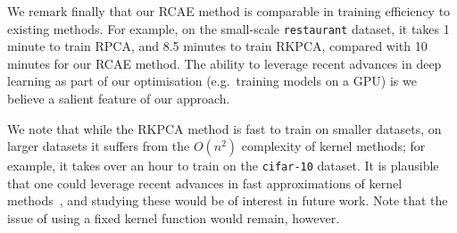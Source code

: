 We remark finally that our RCAE method is comparable in training efficiency to existing methods.
For example, on the small-scale {\tt restaurant} dataset, it takes 1 minute to train RPCA,
and 8.5 minutes to train RKPCA,
compared with 10 minutes for our RCAE method.
The ability to leverage recent advances in deep learning as part of our optimisation (e.g.\ training models on a GPU) is we believe a salient feature of our approach.

We note that while the RKPCA method is fast to train on smaller datasets, on larger datasets it suffers from the $O(n^2)$ complexity of kernel methods;
for example, it takes over an hour to train on the {\tt cifar-10} dataset.
It is plausible that one could leverage recent advances in fast approximations of kernel methods~\cite{Lopez-Paz:2014}, and studying these would be of interest in future work.
Note that the issue of using a fixed kernel function would remain, however.
